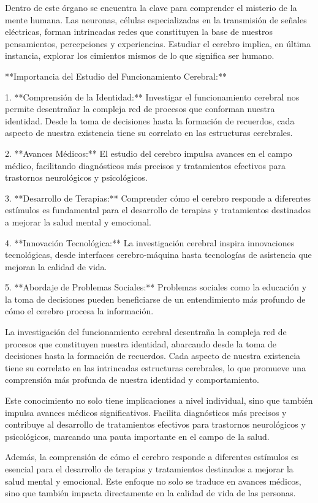 \documentclass{article}
\begin{document}
	Dentro de este órgano se encuentra la clave para comprender el misterio de la mente humana. Las neuronas, células especializadas en la transmisión de señales eléctricas, forman intrincadas redes que constituyen la base de nuestros pensamientos, percepciones y experiencias. Estudiar el cerebro implica, en última instancia, explorar los cimientos mismos de lo que significa ser humano.
	
	**Importancia del Estudio del Funcionamiento Cerebral:**
	
	1. **Comprensión de la Identidad:** Investigar el funcionamiento cerebral nos permite desentrañar la compleja red de procesos que conforman nuestra identidad. Desde la toma de decisiones hasta la formación de recuerdos, cada aspecto de nuestra existencia tiene su correlato en las estructuras cerebrales.
	
	2. **Avances Médicos:** El estudio del cerebro impulsa avances en el campo médico, facilitando diagnósticos más precisos y tratamientos efectivos para trastornos neurológicos y psicológicos.
	
	3. **Desarrollo de Terapias:** Comprender cómo el cerebro responde a diferentes estímulos es fundamental para el desarrollo de terapias y tratamientos destinados a mejorar la salud mental y emocional.
	
	4. **Innovación Tecnológica:** La investigación cerebral inspira innovaciones tecnológicas, desde interfaces cerebro-máquina hasta tecnologías de asistencia que mejoran la calidad de vida.
	
	5. **Abordaje de Problemas Sociales:** Problemas sociales como la educación y la toma de decisiones pueden beneficiarse de un entendimiento más profundo de cómo el cerebro procesa la información.
	
	La investigación del funcionamiento cerebral desentraña la compleja red de procesos que constituyen nuestra identidad, abarcando desde la toma de decisiones hasta la formación de recuerdos. Cada aspecto de nuestra existencia tiene su correlato en las intrincadas estructuras cerebrales, lo que promueve una comprensión más profunda de nuestra identidad y comportamiento.
	
	Este conocimiento no solo tiene implicaciones a nivel individual, sino que también impulsa avances médicos significativos. Facilita diagnósticos más precisos y contribuye al desarrollo de tratamientos efectivos para trastornos neurológicos y psicológicos, marcando una pauta importante en el campo de la salud.
	
	Además, la comprensión de cómo el cerebro responde a diferentes estímulos es esencial para el desarrollo de terapias y tratamientos destinados a mejorar la salud mental y emocional. Este enfoque no solo se traduce en avances médicos, sino que también impacta directamente en la calidad de vida de las personas.
	
\end{document}
